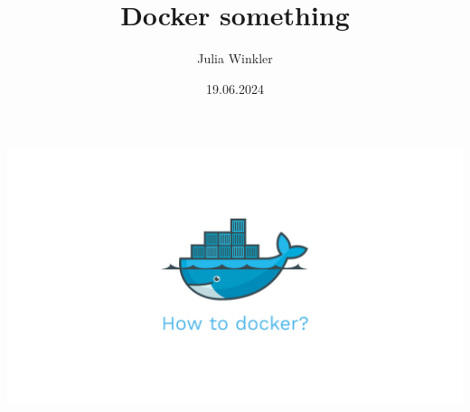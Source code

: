 \documentclass[22pt]{beamer}
\title{Docker something}
\author{Julia Winkler}
\date{19.06.2024}
\begin{document}

\begin{frame}[plain]
    \vfill
    \begin{center}
        \includegraphics[width=1\textwidth]{Bilder/docker-how.png}
    \end{center}
    \vfill
\end{frame}

\maketitle
\end{document}
